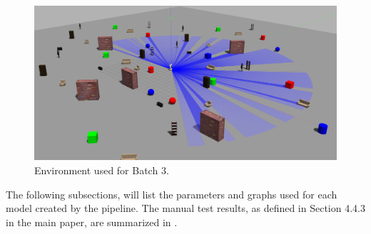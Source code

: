 \begin{figure}[H]%
\centering
\includegraphics[width=1\textwidth]{Bilder/env4.png} 
\caption[]{Environment used for Batch 3.}
\label{env4}
\end{figure}

The following subsections, will list the parameters and graphs used for each model created by the pipeline. The manual test results, as defined in Section 4.4.3 in the main paper, are summarized in .

\newpage
